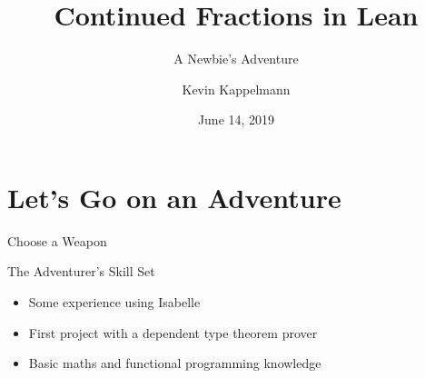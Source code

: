 \documentclass{beamer}
\title{Continued Fractions in Lean} %
\subtitle{A Newbie's Adventure}
\author{Kevin Kappelmann} %
\institute[VU Amsterdam]{Vrije Universiteit Amsterdam}
\date{June 14, 2019} %
\begin{document}
\maketitle

\section{Let's Go on an Adventure}
\begin{frame}{Choose a Weapon}
\pause
{}
\end{frame}
\begin{frame}{The Adventurer's Skill Set}
\pause
\begin{itemize}[<+->]
\item Some experience using Isabelle
\item First project with a dependent type theorem prover
\item Basic maths and functional programming knowledge
\end{itemize}
\end{frame}
\end{document}
